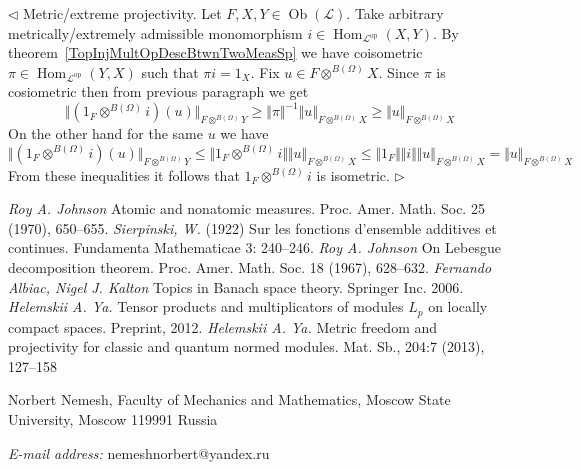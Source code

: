 \documentclass[12pt]{article}
\newenvironment{proof}{\par $\triangleleft$}{$\triangleright$}
\begin{document}
\begin{proof}
    Metric/extreme projectivity. Let $F,X,Y\in\operatorname{Ob}(\mathscr{L})$.
    Take arbitrary metrically/extremely admissible monomorphism
    $i\in\operatorname{Hom}_{\mathscr{L}^{\operatorname{op}}}(X, Y)$. By
    theorem~\ref{TopInjMultOpDescBtwnTwoMeasSp} we have coisometric
    $\pi\in\operatorname{Hom}_{\mathscr{L}^{\operatorname{op}}}(Y, X)$ such
    that $\pi i=1_{X}$. Fix
    $u\in F\mathop{\operatorname{\otimes}}^{B(\Omega)} X$. Since $\pi$ is
    cosiometric then from previous paragraph we get
    $$
        \Vert(1_F \mathop{\operatorname{\otimes}}^{B(\Omega)}
        i)(u)\Vert_{F\mathop{\operatorname{\otimes}}^{B(\Omega)} Y}
        \geq
        \Vert\pi\Vert^{-1}\Vert
        u\Vert_{F\mathop{\operatorname{\otimes}}^{B(\Omega)} X}
        \geq
        \Vert u\Vert_{F\mathop{\operatorname{\otimes}}^{B(\Omega)} X}
    $$
    On the other hand for the same $u$ we have
    $$
        \Vert(1_F \mathop{\operatorname{\otimes}}^{B(\Omega)}
        i)(u)\Vert_{F\mathop{\operatorname{\otimes}}^{B(\Omega)} Y}
        \leq
        \Vert 1_F \mathop{\operatorname{\otimes}}^{B(\Omega)} i\Vert\Vert
        u\Vert_{F\mathop{\operatorname{\otimes}}^{B(\Omega)} X}
        \leq
        \Vert 1_F\Vert\Vert i\Vert \Vert
        u\Vert_{F\mathop{\operatorname{\otimes}}^{B(\Omega)} X} = \Vert
        u\Vert_{F\mathop{\operatorname{\otimes}}^{B(\Omega)} X}
    $$
    From these inequalities it follows that
    $1_F \mathop{\operatorname{\otimes}}^{B(\Omega)} i$ is isometric.
\end{proof}

\begin{thebibliography}{999}
    \textit{Roy A. Johnson} Atomic and nonatomic measures.
    Proc. Amer. Math. Soc. 25 (1970), 650--655.
    \textit{Sierpinski, W.} (1922) Sur les fonctions d'ensemble additives
    et continues. Fundamenta Mathematicae 3: 240–246.
    \textit{Roy A. Johnson} On Lebesgue decomposition theorem.
    Proc. Amer. Math. Soc. 18 (1967), 628--632.
    \textit{Fernando Albiac, Nigel J. Kalton} Topics in Banach space theory.
    Springer Inc. 2006.
    \textit{Helemskii A. Ya.} Tensor products and multiplicators of modules
    $L_p$ on locally compact spaces. Preprint, 2012.
    \textit{Helemskii A. Ya.} Metric freedom and projectivity for classic
    and quantum normed modules. Mat. Sb., 204:7 (2013), 127–158
\end{thebibliography}

Norbert Nemesh, Faculty of Mechanics and Mathematics,
Moscow State University, Moscow 119991 Russia

\textit{E-mail address:} nemeshnorbert@yandex.ru
\end{document}
